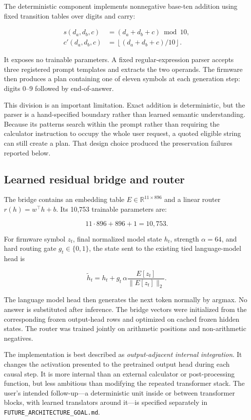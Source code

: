 \documentclass[11pt]{article}
\newcommand{\code}[1]{\texttt{#1}}
\begin{document}
The deterministic component implements nonnegative base-ten addition using
fixed transition tables over digits and carry:

\begin{align}
s(d_a,d_b,c)&=(d_a+d_b+c)\bmod 10,\\
c'(d_a,d_b,c)&=\left\lfloor(d_a+d_b+c)/10\right\rfloor.
\end{align}

It exposes no trainable parameters. A fixed regular-expression parser accepts
three registered prompt templates and extracts the two operands. The firmware
then produces a plan containing one of eleven symbols at each generation step:
digits 0--9 followed by end-of-answer.

This division is an important limitation. Exact addition is deterministic, but
the parser is a hand-specified boundary rather than learned semantic
understanding. Because its patterns search within the prompt rather than
requiring the calculator instruction to occupy the whole user request, a
quoted eligible string can still create a plan. That design choice produced
the preservation failures reported below.

\subsection{Learned residual bridge and router}

The bridge contains an embedding table
\(E\in\mathbb{R}^{11\times896}\) and a linear router
\(r(h)=w^\top h+b\). Its 10,753 trainable parameters are:

\[
11\cdot896 + 896 + 1 = 10{,}753.
\]

For firmware symbol \(z_t\), final normalized model state \(h_t\), strength
\(\alpha=64\), and hard routing gate \(g_t\in\{0,1\}\), the state sent to the
existing tied language-model head is

\[
\widetilde h_t=h_t+g_t\,\alpha
\frac{E[z_t]}{\lVert E[z_t]\rVert_2}.
\]

The language model head then generates the next token normally by argmax. No
answer is substituted after inference. The bridge vectors were initialized
from the corresponding frozen output-head rows and optimized on cached frozen
hidden states. The router was trained jointly on arithmetic positions and
non-arithmetic negatives.

The implementation is best described as \emph{output-adjacent internal
integration}. It changes the activation presented to the pretrained output
head during each causal step. It is more internal than an external calculator
or post-processing function, but less ambitious than modifying the repeated
transformer stack. The user's intended follow-up---a deterministic unit inside
or between transformer blocks, with learned translators around it---is
specified separately in \code{FUTURE\_ARCHITECTURE\_GOAL.md}.
\end{document}
